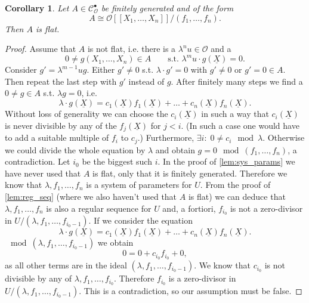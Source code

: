 \documentclass{article}
\theoremstyle{plain}%
\newtheorem{corollary}{Corollary}[section]
\theoremstyle{definition}
\theoremstyle{remark}
\newcommand{\cob}{\mathcal{C}_\mathcal{O}^\bullet}
\begin{document}
\begin{corollary}\textup{\cite[corollary 5.12]{darmon1995fermat}}\label{cor:flatness}
    Let \(A \in \cob\) be finitely generated and of the form
    \[
        A \cong \mathcal{O}[[X_1, \dots, X_n]]/(f_1, \dots, f_n).  
    \]
    Then \(A\) is flat.
\end{corollary}
\begin{proof}
    Assume that \(A\) is not flat, i.e. there is a \(\lambda^n u \in \mathcal{O}\) and a
    \[0 \neq g(X_1, \dots, X_n) \in A \qquad \text{s.t. } \lambda^m u \cdot g(\underline{X}) = 0.\]
    Consider \(g' = \lambda^{m-1}u g\). 
    Either \(g' \neq 0\) s.t. \(\lambda \cdot g' = 0\) with \(g' \neq 0\) or \(g' = 0 \in A\).
    Then repeat the last step with \(g'\) instead of \(g\). After finitely many steps we find a \(0 \neq g \in A\) s.t. 
    \(\lambda g = 0\), i.e.
    \[
        \lambda \cdot g(\underline{X}) = c_1(\underline{X})f_1(\underline{X}) + \dots + c_n(\underline{X})f_n(\underline{X}). 
    \]
    Without loss of generality we can choose the \(c_i(\underline{X})\) in such a way that \(c_i(\underline{X})\) 
    is never divisible by any of the \(f_{j}(\underline{X})\) for \(j < i\). 
    (In such a case one would have to add a suitable multiple of \(f_i\) to \(c_j\).)
    Furthermore, \(\exists i\colon\;0 \neq c_i \mod \lambda\). Otherwise we could divide the whole equation by
    \(\lambda\) and obtain \(g = 0 \mod (f_1, \dots, f_n)\), a contradiction. Let \(i_0\) be the biggest such \(i\).
    In the proof of \cref{lem:sys_params} we have never used that \(A\) is flat, 
    only that it is finitely generated. Therefore we know that \(\lambda, f_1, \dots, f_n\) is a system of parameters
    for \(U\). 
    From the proof of \cref{lem:reg_seq} (where we also haven't used that \(A\) is flat) we can deduce that
    \(\lambda, f_1, \dots, f_n\) is also a regular sequence for \(U\) and, a fortiori, \(f_{i_0}\) is not a 
    zero-divisor in \(U/(\lambda, f_1, \dots, f_{i_0-1})\).
    If we consider the equation
    \[
        \lambda \cdot g(\underline{X}) = c_1(\underline{X})f_1(\underline{X}) + \dots + c_n(\underline{X})f_n(\underline{X}). 
    \]
    \(\mod (\lambda, f_1, \dots, f_{i_0-1})\) we obtain
    \[
        0 = 0 + c_{i_0} f_{i_0} + 0,
    \]
    as all other terms are in the ideal \((\lambda, f_1, \dots, f_{i_0-1})\).
    We know that \(c_{i_0}\) is not divisible by any of \(\lambda, f_1, \dots, f_{i_0}\).
    Therefore \(f_{i_0}\) is a zero-divisor in \(U/(\lambda, f_1, \dots, f_{i_0-1})\). This is a contradiction,
    so our assumption must be false.
\end{proof}
\end{document}
